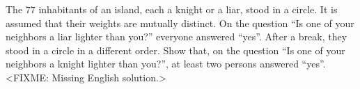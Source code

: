\problem
The $77$ inhabitants of an island, each a knight or a liar, stood in a circle.
It is assumed that their weights are mutually distinct.
On the question ``Is one of your neighbors a liar lighter than you?'' everyone
answered ``yes''.
After a break, they stood in a circle in a different order.
Show that, on the question
``Is one of your neighbors a knight lighter than you?'',
at least two persons answered ``yes''.
\solution
<FIXME: Missing English solution.>
\endproblem
